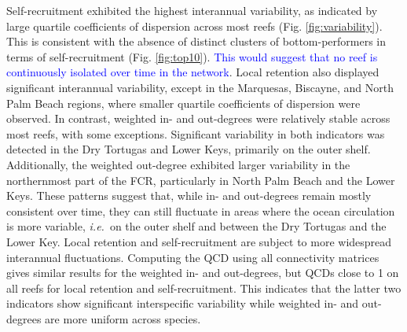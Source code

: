 \documentclass[preprint,12pt,authoryear]{elsarticle}
\newcommand{\modif}[1]{\textcolor{blue}{#1}}
\newcommand{\ie}{{\it i.e.}\ }
\begin{document}
	Self-recruitment exhibited the highest interannual variability, as indicated by large quartile coefficients of dispersion across most reefs (Fig. \ref{fig:variability}). This is consistent with the absence of distinct clusters of bottom-performers in terms of self-recruitment (Fig. \ref{fig:top10}). \modif{This would suggest that no reef is continuously isolated over time in the network}. Local retention also displayed significant interannual variability, except in the Marquesas, Biscayne, and North Palm Beach regions, where smaller quartile coefficients of dispersion were observed. In contrast, weighted in- and out-degrees were relatively stable across most reefs, with some exceptions. Significant variability in both indicators was detected in the Dry Tortugas and Lower Keys, primarily on the outer shelf. Additionally, the weighted out-degree exhibited larger variability in the northernmost part of the FCR, particularly in North Palm Beach and the Lower Keys. These patterns suggest that, while in- and out-degrees remain mostly consistent over time, they can still fluctuate in areas where the ocean circulation is more variable, \ie on the outer shelf and between the Dry Tortugas and the Lower Key. Local retention and self-recruitment are subject to more widespread interannual fluctuations. Computing the QCD using all connectivity matrices gives similar results for the weighted in- and out-degrees, but QCDs close to 1 on all reefs for local retention and self-recruitment. This indicates that the latter two indicators show significant interspecific variability while weighted in- and out-degrees are more uniform across species.
	
\end{document}
